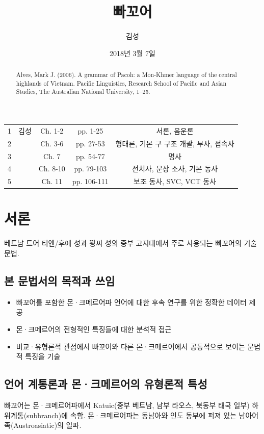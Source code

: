 
\date{2018년 3월 7일}

\begin{frontmatter}
\title{빠꼬어}
\author{김성}
\address{한국외국어대학교 베트남어과}
\begin{abstract}
Alves, Mark J. (2006). A grammar of Pacoh: a Mon-Khmer language of the central highlands of Vietnam. Pacific Linguistics, Research School of Pacific and Asian Studies, The Australian National University, 1--25.
\end{abstract}
\end{frontmatter}


\begin{center}
\begin{tabular}{ccccc}
\hline
1 & 김성 & Ch. 1-2 & pp. 1-25 & 서론, 음운론 \\
2 & & Ch. 3-6 & pp. 27-53 & 형태론, 기본 구 구조 개괄, 부사, 접속사 \\
3 & & Ch. 7 & pp. 54-77 & 명사 \\
4 & & Ch. 8-10 & pp. 79-103 & 전치사, 문장 소사, 기본 동사 \\
5 & & Ch. 11 & pp. 106-111 & 보조 동사, SVC, VCT 동사 \\
\hline
\end{tabular}
\end{center}

\section{서론}
베트남 트어 티엔/후에 성과 꽝찌 성의 중부 고지대에서 주로 사용되는 빠꼬어의 기술 문법.

\subsection{본 문법서의 목적과 쓰임}
\begin{itemize}
\item 빠꼬어를 포함한 몬·크메르어파 언어에 대한 후속 연구를 위한 정확한 데이터 제공
\item 몬·크메르어의 전형적인 특징들에 대한 분석적 접근
\item 비교·유형론적 관점에서 빠꼬어와 다른 몬·크메르어에서 공통적으로 보이는 문법적 특징을 기술
\end{itemize}
\subsection{언어 계통론과 몬·크메르어의 유형론적 특성}
빠꼬어는 몬·크메르어파에서 Katuic(중부 베트남, 남부 라오스, 북동부 태국 일부) 하위계통(subbranch)에 속함. 몬·크메르어파는 동남아와 인도 동부에 퍼져 있는 남아어족(Austroasiatic)의 일파.

